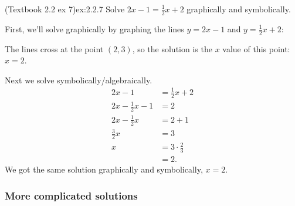 \documentclass{article}
\begin{document}
\begin{example}{(Textbook 2.2 ex 7)}{ex:2.2.7}
    Solve $2x-1=\frac{1}{2}x+2$ graphically and symbolically.
\end{example}
\begin{solution}
    First, we'll solve graphically by graphing the lines $y=2x-1$ and $y=\frac{1}{2}x+2$:
    \begin{center}\end{center}
    The lines cross at the point $(2,3)$, so the solution is the $x$ value of this point: $x=2$.
    
    Next we solve symbolically/algebraically.
    \begin{align*}
        2x-1&=\frac{1}{2}x+2\\
        2x-\frac{1}{2}x-1&=2\\
        2x-\frac{1}{2}x&=2+1\\
        \frac{3}{2}x&=3\\
        x&=3\cdot\frac{2}{3}\\
        &=2.
    \end{align*}
    We got the same solution graphically and symbolically, $x=2$.
\end{solution}

\subsubsection{More complicated solutions}
\end{document}
